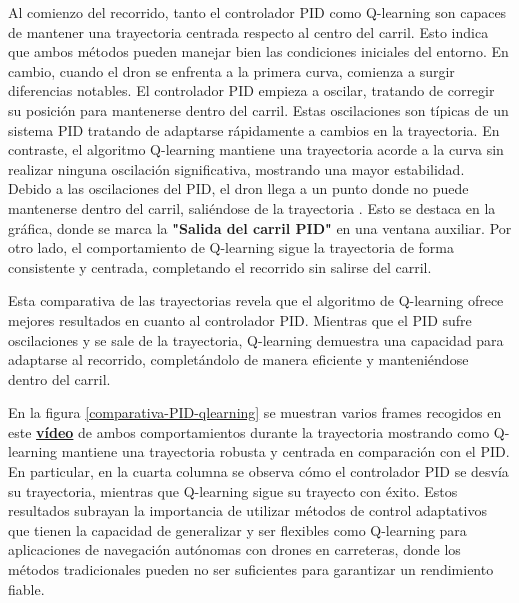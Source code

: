 Al comienzo del recorrido, tanto el controlador PID como Q-learning
son capaces de mantener una trayectoria centrada respecto al centro del carril. Esto indica que ambos métodos pueden manejar bien las condiciones iniciales del entorno. En cambio, cuando 
el dron se enfrenta a la primera curva, comienza a surgir diferencias notables. El controlador PID empieza a oscilar, tratando de corregir su posición para mantenerse dentro del carril. Estas 
oscilaciones son típicas de un sistema PID tratando de adaptarse rápidamente a cambios en la trayectoria. En contraste, el algoritmo Q-learning mantiene una trayectoria acorde a la curva 
sin realizar ninguna oscilación significativa, mostrando una mayor estabilidad. Debido a las oscilaciones del PID, el dron llega a un punto donde no puede mantenerse dentro del carril, saliéndose 
de la trayectoria . Esto se destaca en la gráfica, donde se marca la \textbf{"Salida del carril PID"} en una ventana auxiliar. Por otro lado, el comportamiento de Q-learning sigue la trayectoria  de forma consistente 
y centrada, completando el recorrido sin salirse del carril.

Esta comparativa de las trayectorias revela que el algoritmo de Q-learning ofrece mejores resultados en cuanto al controlador PID. Mientras que el PID sufre oscilaciones y se sale de la trayectoria,
Q-learning demuestra una capacidad para adaptarse al recorrido, completándolo de manera eficiente y manteniéndose dentro del carril. 

En la figura \ref{comparativa-PID-qlearning} se muestran varios frames recogidos en este \href{https://youtu.be/Ft8N0yvQvjA?si=8o1z48FXkC528yh6}{\textbf{vídeo}} de ambos comportamientos durante la trayectoria mostrando como Q-learning mantiene una trayectoria robusta y centrada 
en comparación con el PID. En particular, en la cuarta columna se observa cómo el controlador PID se desvía su trayectoria, mientras que Q-learning sigue su trayecto con éxito. 
Estos resultados subrayan la importancia de utilizar métodos de control adaptativos que tienen la capacidad de generalizar y ser flexibles
como Q-learning para aplicaciones de navegación autónomas con drones en carreteras, donde los métodos 
tradicionales pueden no ser suficientes para garantizar un rendimiento fiable. 

